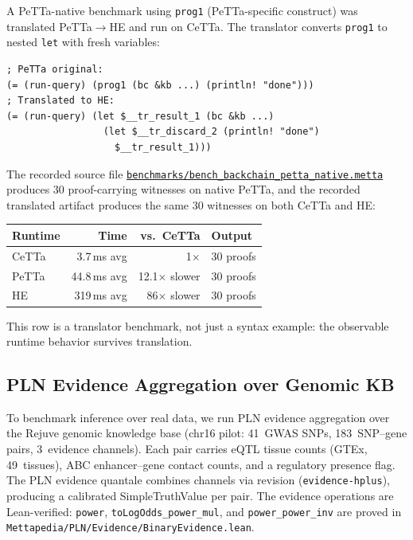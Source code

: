 \documentclass[11pt]{article}
\newcommand{\code}[1]{\texttt{#1}}
\newcommand{\PeTTa}{\textup{PeTTa}}
\newcommand{\HE}{\textup{HE}}
\newcommand{\CeTTa}{\textup{CeTTa}}
\begin{document}
A PeTTa-native benchmark using \code{prog1} (PeTTa-specific construct)
was translated PeTTa$\to$HE and run on \CeTTa{}.  The translator
converts \code{prog1} to nested \code{let} with fresh variables:
\begin{lstlisting}[language={},basicstyle=\ttfamily\scriptsize]
; PeTTa original:
(= (run-query) (prog1 (bc &kb ...) (println! "done")))
; Translated to HE:
(= (run-query) (let $__tr_result_1 (bc &kb ...)
                 (let $__tr_discard_2 (println! "done")
                   $__tr_result_1)))
\end{lstlisting}
The recorded source file
\href{https://github.com/zariuq/CeTTa/blob/07928677c0237a19b2f3c32dffca28d7d2626723/benchmarks/bench_backchain_petta_native.metta}{\code{benchmarks/bench\_backchain\_petta\_native.metta}}
produces 30 proof-carrying witnesses on native \PeTTa{}, and the
recorded translated artifact produces the same 30 witnesses on both
\CeTTa{} and \HE{}:
\begin{center}
\begin{tabular}{lrrl}
\toprule
Runtime & Time & vs.\ \CeTTa{} & Output \\
\midrule
\CeTTa{} & 3.7\,ms avg  & 1$\times$          & 30 proofs \\
\PeTTa{} & 44.8\,ms avg & 12.1$\times$ slower & 30 proofs \\
\HE{}    & 319\,ms avg  & 86$\times$ slower  & 30 proofs \\
\bottomrule
\end{tabular}
\end{center}
This row is a translator benchmark, not just a syntax example: the
observable runtime behavior survives translation.

\subsection{PLN Evidence Aggregation over Genomic KB}

To benchmark inference over real data, we run PLN evidence aggregation
over the Rejuve genomic knowledge base (chr16 pilot: 41~GWAS SNPs,
183~SNP--gene pairs, 3~evidence channels).  Each pair carries
eQTL tissue counts (GTEx, 49~tissues), ABC enhancer--gene contact
counts, and a regulatory presence flag.  The PLN evidence quantale
combines channels via revision (\code{evidence-hplus}), producing a
calibrated SimpleTruthValue per pair.  The evidence operations are
Lean-verified: \code{power}, \code{toLogOdds\_power\_mul}, and
\code{power\_power\_inv} are proved in
\code{Mettapedia/PLN/Evidence/BinaryEvidence.lean}.
\end{document}
